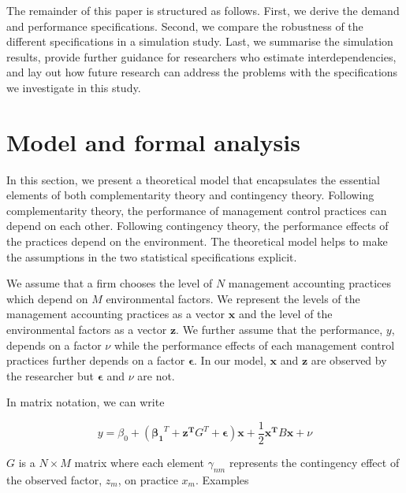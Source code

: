 \documentclass[12pt]{article}
\begin{document}
The remainder of this paper is structured as follows. First, we derive the demand and performance specifications. Second, we compare the robustness of the different specifications in a simulation study. Last, we summarise the simulation results, provide further guidance for researchers who estimate interdependencies, and lay out how future research can address the problems with the specifications we investigate in this study.

\section{Model and formal analysis}\label{model-and-formal-analysis}

In this section, we present a theoretical model that encapsulates the essential elements of both complementarity theory and contingency theory. Following complementarity theory, the performance of management control practices can depend on each other. Following contingency theory, the performance effects of the practices depend on the environment. The theoretical model helps to make the assumptions in the two statistical specifications explicit. 

We assume that a firm chooses the level of $N$ management accounting practices which depend on $M$ environmental factors. We represent the levels of the management accounting practices as a vector $\mathbf{x}$ and the level of the environmental factors as a vector $\mathbf{z}$. We further assume that the performance, $y$, depends on a factor $\nu$ while the performance effects of each management control practices further depends on a factor $\mathbf{\epsilon}$. In our model, $\mathbf{x}$ and $\mathbf{z}$ are observed by the researcher but $\mathbf{\epsilon}$ and $\nu$ are not. 


In matrix notation, we can write

\begin{equation} \label{eq:structural-matrix}
y = \beta_0 + (\mathbf{\beta_1}^T + \mathbf{z^T} G^T + \mathbf{\epsilon})
     \mathbf{x} + \frac{1}{2}\mathbf{x^T} B \mathbf{x} + \nu
\end{equation}

$G$ is a $N \times M$ matrix where each element $\gamma_{nm}$ represents the contingency effect of the observed factor, $z_m$, on practice $x_m$. Examples
\end{document}
